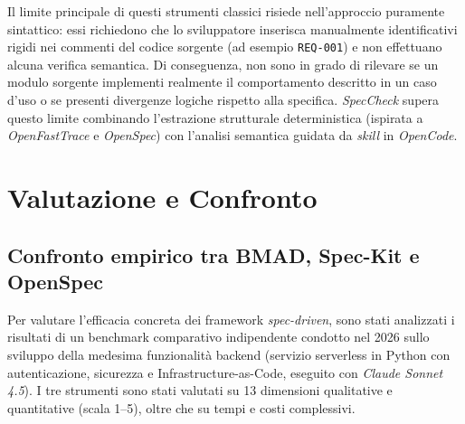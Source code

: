 \documentclass[a4paper, 11pt]{article}
\begin{document}
Il limite principale di questi strumenti classici risiede nell'approccio puramente sintattico: essi richiedono che lo sviluppatore inserisca manualmente identificativi rigidi nei commenti del codice sorgente (ad esempio \texttt{REQ-001}) e non effettuano alcuna verifica semantica. Di conseguenza, non sono in grado di rilevare se un modulo sorgente implementi realmente il comportamento descritto in un caso d'uso o se presenti divergenze logiche rispetto alla specifica. \textit{SpecCheck} supera questo limite combinando l'estrazione strutturale deterministica (ispirata a \textit{OpenFastTrace} e \textit{OpenSpec}) con l'analisi semantica guidata da \textit{skill} in \textit{OpenCode}.


\section{Valutazione e Confronto}

\subsection{Confronto empirico tra BMAD, Spec-Kit e OpenSpec}
Per valutare l'efficacia concreta dei framework \textit{spec-driven}, sono stati analizzati i risultati di un benchmark comparativo indipendente condotto nel 2026 sullo sviluppo della medesima funzionalità backend (servizio serverless in Python con autenticazione, sicurezza e Infrastructure-as-Code, eseguito con \textit{Claude Sonnet 4.5}). I tre strumenti sono stati valutati su 13 dimensioni qualitative e quantitative (scala 1--5), oltre che su tempi e costi complessivi.
\end{document}
